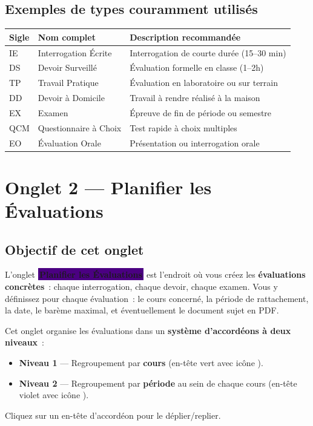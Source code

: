 \documentclass[12pt,a4paper]{report}
\newcommand{\onglet}[1]{{\colorbox{indigo}{\small\sffamily\bfseries\color{white}\,#1\,}}}
\begin{document}
\section{Exemples de types couramment utilisés}

\begin{center}
\begin{tabularx}{\textwidth}{llX}
\toprule
\textbf{Sigle} & \textbf{Nom complet} & \textbf{Description recommandée} \\
\midrule
IE & Interrogation Écrite & Interrogation de courte durée (15--30 min) \\
DS & Devoir Surveillé & Évaluation formelle en classe (1--2h) \\
TP & Travail Pratique & Évaluation en laboratoire ou sur terrain \\
DD & Devoir à Domicile & Travail à rendre réalisé à la maison \\
EX & Examen & Épreuve de fin de période ou semestre \\
QCM & Questionnaire à Choix & Test rapide à choix multiples \\
EO & Évaluation Orale & Présentation ou interrogation orale \\
\bottomrule
\end{tabularx}
\end{center}

\newpage
\chapter{Onglet 2 — Planifier les Évaluations}

\section{Objectif de cet onglet}

L'onglet \onglet{Planifier les Évaluations} est l'endroit où vous créez les \textbf{évaluations concrètes}~: chaque interrogation, chaque devoir, chaque examen. Vous y définissez pour chaque évaluation~: le cours concerné, la période de rattachement, la date, le barème maximal, et éventuellement le document sujet en PDF.

\begin{info}
Cet onglet organise les évaluations dans un \textbf{système d'accordéons à deux niveaux}~:
\begin{itemize}
  \item \textbf{Niveau 1} — Regroupement par \textbf{cours} (en-tête vert avec icône \faBook).
  \item \textbf{Niveau 2} — Regroupement par \textbf{période} au sein de chaque cours (en-tête violet avec icône \faCalendar).
\end{itemize}
Cliquez sur un en-tête d'accordéon pour le déplier/replier.
\end{info}
\end{document}
